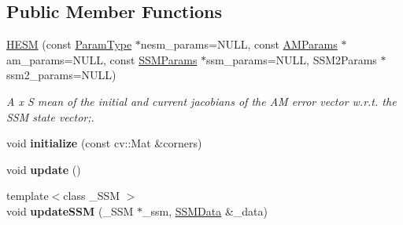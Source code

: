 \subsection*{Public Member Functions}
\begin{DoxyCompactItemize}
\item 
\hypertarget{classHESM_a71c77aa3cfab2430af02a0798cbd173f}{\hyperlink{classHESM_a71c77aa3cfab2430af02a0798cbd173f}{H\-E\-S\-M} (const \hyperlink{structHESMParams}{Param\-Type} $\ast$nesm\-\_\-params=N\-U\-L\-L, const \hyperlink{structAMParams}{A\-M\-Params} $\ast$am\-\_\-params=N\-U\-L\-L, const \hyperlink{structSSMParams}{S\-S\-M\-Params} $\ast$ssm\-\_\-params=N\-U\-L\-L, S\-S\-M2\-Params $\ast$ssm2\-\_\-params=N\-U\-L\-L)}\label{classHESM_a71c77aa3cfab2430af02a0798cbd173f}

\begin{DoxyCompactList}\small\item\em A x S mean of the initial and current jacobians of the A\-M error vector w.\-r.\-t. the S\-S\-M state vector;. \end{DoxyCompactList}\item 
\hypertarget{classHESM_aa0134870cb70c8123643d425549fd2b3}{void {\bfseries initialize} (const cv\-::\-Mat \&corners)}\label{classHESM_aa0134870cb70c8123643d425549fd2b3}

\item 
\hypertarget{classHESM_a3b5036e4cbf5aa113e43ead3efb61cb1}{void {\bfseries update} ()}\label{classHESM_a3b5036e4cbf5aa113e43ead3efb61cb1}

\item 
\hypertarget{classHESM_a1c2db3ae802c81f00b0c4093612c114d}{{\footnotesize template$<$class \-\_\-\-S\-S\-M $>$ }\\void {\bfseries update\-S\-S\-M} (\-\_\-\-S\-S\-M $\ast$\-\_\-ssm, \hyperlink{structSSMData}{S\-S\-M\-Data} \&\-\_\-data)}\label{classHESM_a1c2db3ae802c81f00b0c4093612c114d}

\end{DoxyCompactItemize}
